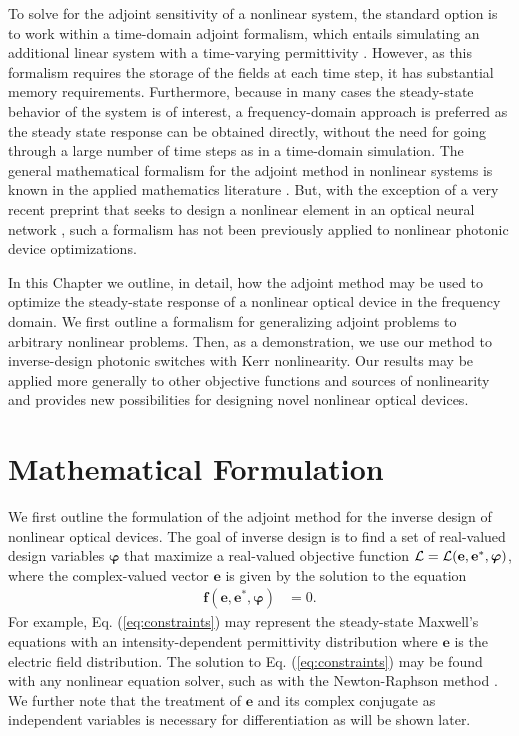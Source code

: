 To solve for the adjoint sensitivity of a nonlinear system, the standard option is to work within a time-domain adjoint formalism, which entails simulating an additional linear system with a time-varying permittivity \cite{elesin_design_2012}.  However, as this formalism requires the storage of the fields at each time step, it has substantial memory requirements.  Furthermore, because in many cases the steady-state behavior of the system is of interest, a frequency-domain approach is preferred as the steady state response can be obtained directly, without the need for going through a large number of time steps as in a time-domain simulation.  The general mathematical formalism for the adjoint method in nonlinear systems is known in the applied mathematics literature \cite{Strang2007}. But, with the exception of a very recent preprint that seeks to design a nonlinear element in an optical neural network  \cite{Khoram_2019}, such a formalism has not been previously applied to nonlinear photonic device optimizations.

In this Chapter we outline, in detail, how the adjoint method may be used to optimize the steady-state response of a nonlinear optical device in the frequency domain. We first outline a formalism for generalizing adjoint problems to arbitrary nonlinear problems.  Then, as a demonstration, we use our method to inverse-design photonic switches with Kerr nonlinearity.  Our results may be applied more generally to other objective functions and sources of nonlinearity and provides new possibilities for designing novel nonlinear optical devices.

\section{Mathematical Formulation}

We first outline the formulation of the adjoint method for the inverse design of nonlinear optical devices.  The goal of inverse design is to find a set of real-valued design variables $\bm{\varphi}$ that maximize a real-valued objective function $\mathbf{\mathcal{L}} = \mathbf{\mathcal{L}}(\mathbf{e}, \mathbf{e}^*, \bm{\varphi})$, where the complex-valued vector $\mathbf{e}$ is given by the solution to the equation
%
\begin{align}
\mathbf{f}(\mathbf{e}, \mathbf{e}^*, \bm{\varphi}) &= 0
\label{eq:constraints}.
\end{align}
%
For example, Eq. (\ref{eq:constraints}) may represent the steady-state Maxwell's equations with an intensity-dependent permittivity distribution where $\mathbf{e}$ is the electric field distribution.  The solution to Eq. (\ref{eq:constraints}) may be found with any nonlinear equation solver, such as with the Newton-Raphson method \cite{press2007numerical}.  We further note that the treatment of $\mathbf{e}$ and its complex conjugate as independent variables is necessary for differentiation as will be shown later.

